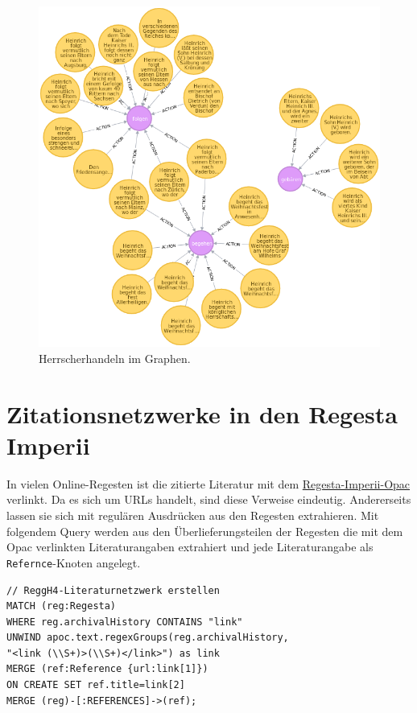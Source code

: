 \documentclass[ngerman,]{scrreprt}
\begin{document}
\begin{figure}
\centering
\includegraphics{Bilder/RI2Graph/ReggH4-Action.png}
\caption{Herrscherhandeln im Graphen.}
\end{figure}

\section{Zitationsnetzwerke in den Regesta Imperii}\label{zitationsnetzwerke-in-den-regesta-imperii}

In vielen Online-Regesten ist die zitierte Literatur mit dem \href{http://opac.regesta-imperii.de/lang_de/}{Regesta-Imperii-Opac} verlinkt. Da es sich um URLs handelt, sind diese Verweise eindeutig. Andererseits lassen sie sich mit regulären Ausdrücken aus den Regesten extrahieren. Mit folgendem Query werden aus den Überlieferungsteilen der Regesten die mit dem Opac verlinkten Literaturangaben extrahiert und jede Literaturangabe als \texttt{Refernce}-Knoten angelegt.

\begin{verbatim}
// ReggH4-Literaturnetzwerk erstellen
MATCH (reg:Regesta)
WHERE reg.archivalHistory CONTAINS "link"
UNWIND apoc.text.regexGroups(reg.archivalHistory,
"<link (\\S+)>(\\S+)</link>") as link
MERGE (ref:Reference {url:link[1]})
ON CREATE SET ref.title=link[2]
MERGE (reg)-[:REFERENCES]->(ref);
\end{verbatim}
\end{document}
